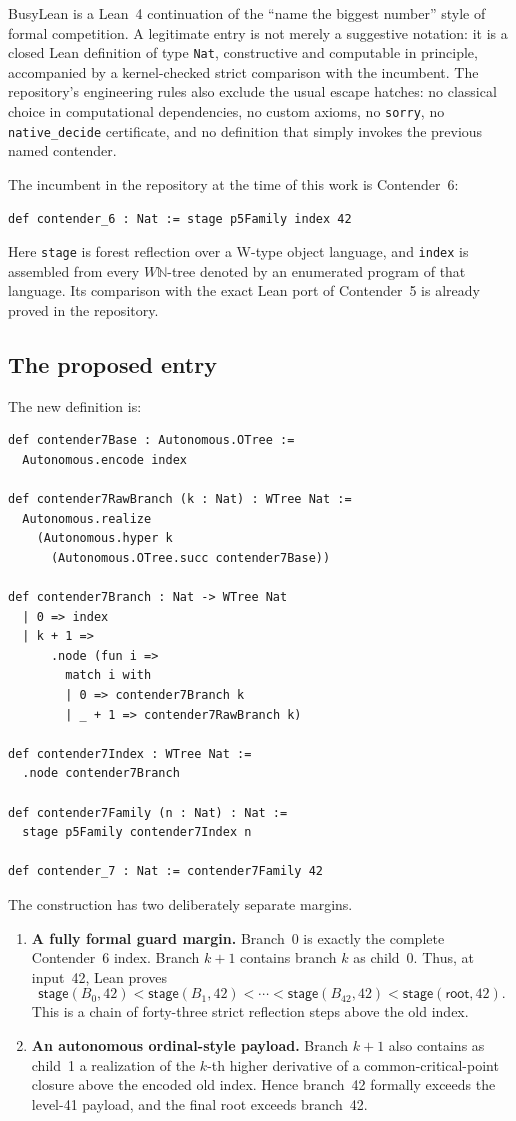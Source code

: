\documentclass[11pt]{article}
\theoremstyle{definition}
\theoremstyle{remark}
\newcommand{\N}{\ensuremath{\mathbb{N}}}
\newcommand{\Stage}{\ensuremath{\mathsf{stage}}}
\newcommand{\lean}[1]{\texttt{#1}}
\begin{document}
BusyLean is a Lean~4 continuation of the ``name the biggest number'' style of
formal competition.  A legitimate entry is not merely a suggestive notation:
it is a closed Lean definition of type \lean{Nat}, constructive and computable
in principle, accompanied by a kernel-checked strict comparison with the
incumbent.  The repository's engineering rules also exclude the usual escape
hatches: no classical choice in computational dependencies, no custom axioms,
no \lean{sorry}, no \lean{native\_decide} certificate, and no definition that
simply invokes the previous named contender.

The incumbent in the repository at the time of this work is Contender~6:
\begin{lstlisting}
def contender_6 : Nat := stage p5Family index 42
\end{lstlisting}
Here \lean{stage} is forest reflection over a W-type object language, and
\lean{index} is assembled from every $W\N$-tree denoted by an enumerated program
of that language.  Its comparison with the exact Lean port of Contender~5 is
already proved in the repository.

\subsection{The proposed entry}

The new definition is:
\begin{lstlisting}
def contender7Base : Autonomous.OTree :=
  Autonomous.encode index

def contender7RawBranch (k : Nat) : WTree Nat :=
  Autonomous.realize
    (Autonomous.hyper k
      (Autonomous.OTree.succ contender7Base))

def contender7Branch : Nat -> WTree Nat
  | 0 => index
  | k + 1 =>
      .node (fun i =>
        match i with
        | 0 => contender7Branch k
        | _ + 1 => contender7RawBranch k)

def contender7Index : WTree Nat :=
  .node contender7Branch

def contender7Family (n : Nat) : Nat :=
  stage p5Family contender7Index n

def contender_7 : Nat := contender7Family 42
\end{lstlisting}

The construction has two deliberately separate margins.

\begin{enumerate}[leftmargin=*]
\item \textbf{A fully formal guard margin.}  Branch~0 is exactly the complete
  Contender~6 index.  Branch $k+1$ contains branch $k$ as child~0.  Thus, at
  input~42, Lean proves
  \[
    \Stage(B_0,42)<\Stage(B_1,42)<\cdots<\Stage(B_{42},42)
       <\Stage(\mathsf{root},42).
  \]
  This is a chain of forty-three strict reflection steps above the old index.
\item \textbf{An autonomous ordinal-style payload.}  Branch $k+1$ also contains
  as child~1 a realization of the $k$-th higher derivative of a
  common-critical-point closure above the encoded old index.  Hence branch~42
  formally exceeds the level-41 payload, and the final root exceeds branch~42.
\end{enumerate}
\end{document}
